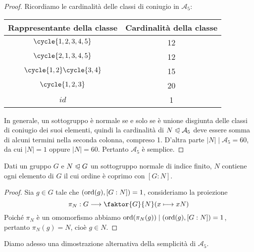 \documentclass[11pt]{scrartcl}
\begin{document}
\begin{proof}
    Ricordiamo le cardinalità delle classi di coniugio in $\mathcal{A}_5$:


    \begingroup
    \renewcommand{\arraystretch}{1.5}
    \begin{center}
    \begin{tabular}{c|c}
        Rappresentante della classe & Cardinalità della classe\\
        \hline
        $\cycle{1, 2, 3, 4, 5}$ & 12\\
        $\cycle{2, 1, 3, 4, 5}$ & 12\\
        $\cycle{1, 2}\cycle{3, 4}$ & 15\\
        $\cycle{1, 2, 3}$ & 20\\
        $id$ & 1 
    \end{tabular}
    \end{center}
    \endgroup
    In generale, un sottogruppo è normale se e solo se è unione disgiunta
    delle classi di coniugio dei suoi elementi, quindi la cardinalità
    di $N \trianglelefteqslant \mathcal{A}_5$ deve essere somma di alcuni 
    termini nella seconda colonna, compreso 1. D'altra parte $|N| \mid \mathcal{A}_5 = 60$,
    da cui $|N| = 1$ oppure $|N| = 60$. Pertanto $\mathcal{A}_5$ è semplice.
\end{proof}

\begin{lemma}
    \label{lemma1.62}
    Dati un gruppo $G$ e $N\trianglelefteqslant G$ un sottogruppo normale di 
    indice finito, $N$ contiene ogni elemento di $G$ il cui ordine è coprimo
    con $[G:N]$.
\end{lemma}

\begin{proof}
    Sia $g \in G$ tale che $(\operatorname{ord}(g), [G:N]) = 1$, consideriamo la proiezione
    \[
        \pi_N:G \longrightarrow \faktor{G}{N} (x \longmapsto xN)
    \]
    Poiché $\pi_N$ è un omomorfismo abbiamo $\operatorname{ord}(\pi_N(g)) \mid (\operatorname{ord}(g), [G:N]) = 1$,
    pertanto $\pi_N(g) = N$, cioè $g \in N$.
\end{proof}

Diamo adesso una dimostrazione alternativa della semplicità di $\mathcal{A}_5$.
\end{document}
